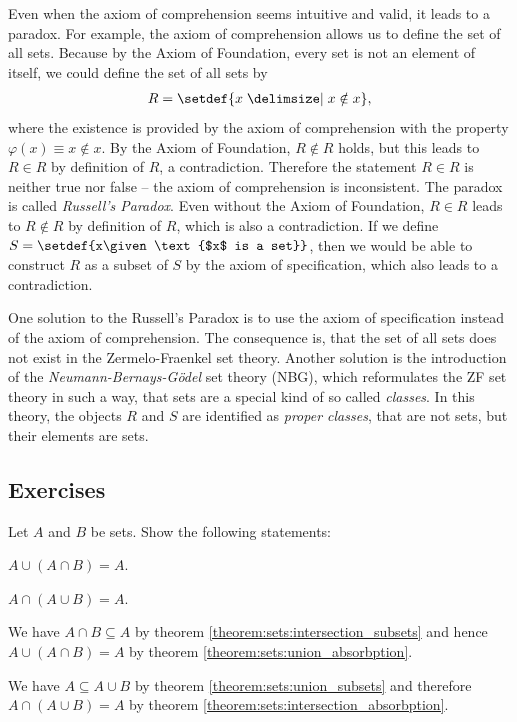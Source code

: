 Even when the axiom of comprehension seems intuitive and valid, it leads to a paradox. For example, the axiom of comprehension allows us to define the set of all sets. Because by the Axiom of Foundation, every set is not an element of itself, we could define the set of all sets by \begin{align}R=\setdef{x\given x\notin x},\end{align}
where the existence is provided by the axiom of comprehension with the property $\varphi(x)\equiv x\notin x$. By the Axiom of Foundation, $R\notin R$ holds, but this leads to $R\in R$ by definition of $R$, a contradiction. Therefore the statement $R\in R$ is neither true nor false -- the axiom of comprehension is inconsistent. The paradox is called \emph{Russell's Paradox}. Even without the Axiom of Foundation, $R\in R$ leads to $R\notin R$ by definition of $R$, which is also a contradiction. If we define $S=\setdef{x\given \text{$x$ is a set}}$, then we would be able to construct $R$ as a subset of $S$ by the axiom of specification, which also leads to a contradiction.

One solution to the Russell's Paradox is to use the axiom of specification instead of the axiom of comprehension. The consequence is, that the set of all sets does not exist in the Zermelo-Fraenkel set theory. Another solution is the introduction of the \emph{Neumann-Bernays-Gödel} set theory (NBG), which reformulates the ZF set theory in such a way, that sets are a special kind of so called \emph{classes}. In this theory, the objects $R$ and $S$ are identified as \emph{proper classes}, that are not sets, but their elements are sets.

\subsection{Exercises}

\begin{exercise}
    Let $A$ and $B$ be sets. Show the following statements:
    \begin{exerciseenumerate}
        \item $A\cup(A\cap B)=A$.
        \item $A\cap(A\cup B)=A$.
    \end{exerciseenumerate}
\end{exercise}
\begin{solution}
    \begin{solutionenumerate}
        \item We have $A\cap B\subseteq A$ by theorem \ref{theorem:sets:intersection_subsets} and hence $A\cup(A\cap B)= A$ by theorem \ref{theorem:sets:union_absorbption}.
        \item We have $A\subseteq A\cup B$ by theorem \ref{theorem:sets:union_subsets} and therefore $A\cap(A\cup B)=A$ by theorem \ref{theorem:sets:intersection_absorbption}.
    \end{solutionenumerate}
\end{solution}

